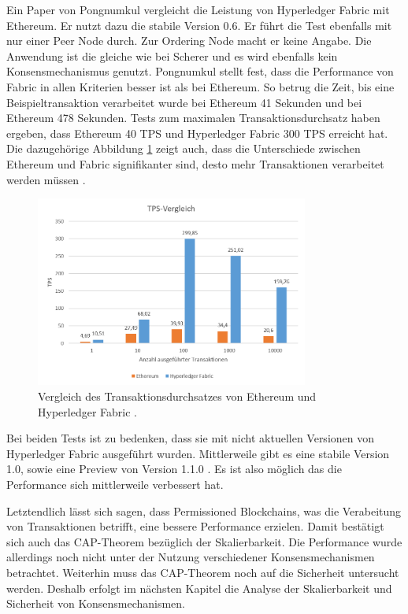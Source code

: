 Ein Paper von Pongnumkul vergleicht die Leistung von Hyperledger Fabric mit Ethereum. Er nutzt dazu die stabile Version 0.6. Er führt die Test ebenfalls mit nur einer Peer Node durch. Zur Ordering Node macht er keine Angabe. Die Anwendung ist die gleiche wie bei Scherer und es wird ebenfalls kein Konsensmechanismus genutzt. Pongnumkul stellt fest, dass die Performance von Fabric in allen Kriterien besser ist als bei Ethereum. So betrug die Zeit, bis eine Beispieltransaktion verarbeitet wurde bei Ethereum 41 Sekunden und bei Ethereum 478 Sekunden. Tests zum maximalen Transaktionsdurchsatz haben ergeben, dass Ethereum 40 TPS und Hyperledger Fabric 300 TPS erreicht hat. Die dazugehörige Abbildung \ref{fig:tps-ethereum-vs-hyperledger} zeigt auch, dass die Unterschiede zwischen Ethereum und Fabric signifikanter sind, desto mehr Transaktionen verarbeitet werden müssen \cite{PongnumkulPerformanceAnalysisPrivate2017a}.

\begin{figure}[htb]
  \centering
    \includegraphics[width=0.8\textwidth,angle=0]{images/tps-ethvshyp}
     \caption{Vergleich des Transaktionsdurchsatzes von Ethereum und Hyperledger Fabric \cite{PongnumkulPerformanceAnalysisPrivate2017a}.}
    \label{fig:tps-ethereum-vs-hyperledger}
\end{figure} 

Bei beiden Tests ist zu bedenken, dass sie mit nicht aktuellen Versionen von Hyperledger Fabric ausgeführt wurden. Mittlerweile gibt es eine stabile Version 1.0, sowie eine Preview von Version 1.1.0 \cite{HyperledgerFabricReleases2018}. Es ist also möglich das die Performance sich mittlerweile verbessert hat.

Letztendlich lässt sich sagen, dass Permissioned Blockchains, was die Verabeitung von Transaktionen betrifft, eine bessere Performance erzielen. Damit bestätigt sich auch das CAP-Theorem bezüglich der Skalierbarkeit. Die Performance wurde allerdings noch nicht unter der Nutzung verschiedener Konsensmechanismen betrachtet. Weiterhin muss das CAP-Theorem noch auf die Sicherheit untersucht werden. Deshalb erfolgt im nächsten Kapitel die Analyse der Skalierbarkeit und Sicherheit von Konsensmechanismen.

